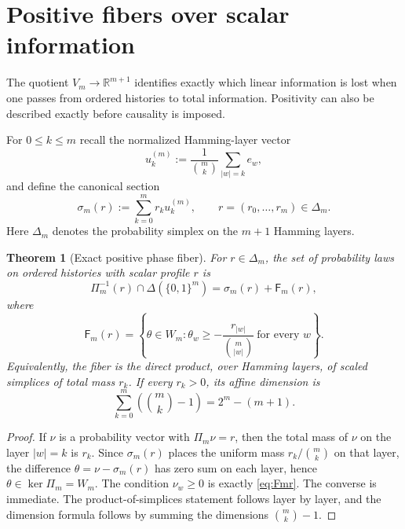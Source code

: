 \documentclass[11pt,a4paper]{article}
\newtheorem{theorem}{Theorem}[section]
\theoremstyle{definition}
\theoremstyle{remark}
\newcommand{\R}{\mathbb R}
\begin{document}
\section{Positive fibers over scalar information}
\label{sec:positive-fiber}

The quotient $V_m\to\R^{m+1}$ identifies exactly which linear information is
lost when one passes from ordered histories to total information.  Positivity
can also be described exactly before causality is imposed.

For $0\le k\le m$ recall the normalized Hamming-layer vector
\[
 u_k^{(m)}
 :=
 \frac{1}{\binom{m}{k}}
 \sum_{|w|=k}e_w,
\]
and define the canonical section
\begin{equation}
 \sigma_m(r)
 :=
 \sum_{k=0}^m r_k u_k^{(m)},
 \qquad
 r=(r_0,\ldots,r_m)\in\Delta_m.
 \label{eq:canonicalsection}
\end{equation}
Here $\Delta_m$ denotes the probability simplex on the $m+1$ Hamming
layers.

\begin{theorem}[Exact positive phase fiber]
\label{thm:positivefiber}
For $r\in\Delta_m$, the set of probability laws on ordered histories with
scalar profile $r$ is
\begin{equation}
 \boxed{
 \Pi_m^{-1}(r)\cap\Delta(\{0,1\}^m)
 =
 \sigma_m(r)+\mathsf F_m(r),
 }
 \label{eq:positivefiber}
\end{equation}
where
\begin{equation}
 \boxed{
 \mathsf F_m(r)
 =
 \left\{
 \theta\in W_m:
 \theta_w\ge
 -\frac{r_{|w|}}{\binom{m}{|w|}}
 \ \text{for every }w
 \right\}.
 }
 \label{eq:Fmr}
\end{equation}
Equivalently, the fiber is the direct product, over Hamming layers, of
scaled simplices of total mass $r_k$.  If every $r_k>0$, its affine dimension
is
\[
 \sum_{k=0}^m\left(\binom{m}{k}-1\right)
 =2^m-(m+1).
\]
\end{theorem}

\begin{proof}
If $\nu$ is a probability vector with $\Pi_m\nu=r$, then the total mass of
$\nu$ on the layer $|w|=k$ is $r_k$.  Since $\sigma_m(r)$ places the uniform
mass $r_k/\binom{m}{k}$ on that layer, the difference
$\theta=\nu-\sigma_m(r)$ has zero sum on each layer, hence
$\theta\in\ker\Pi_m=W_m$.  The condition $\nu_w\ge0$ is exactly
\eqref{eq:Fmr}.  The converse is immediate.  The product-of-simplices
statement follows layer by layer, and the dimension formula follows by
summing the dimensions $\binom{m}{k}-1$.
\end{proof}
\end{document}
